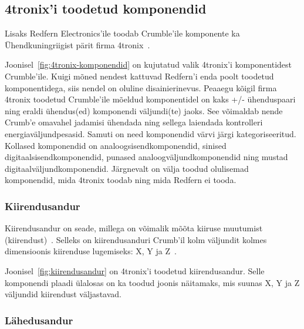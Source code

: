 \documentclass[12pt]{article}
\begin{document}
\subsection{4tronix'i toodetud komponendid}

Lisaks Redfern Electronics’ile toodab Crumble’ile komponente ka Ühendkuningriigist pärit firma 4tronix~\cite{Crumble4tronix}.


Joonisel~\ref{fig:4tronix-komponendid} on kujutatud valik 4tronix’i komponentidest Crumble’ile. Kuigi mõned nendest kattuvad Redfern’i enda poolt toodetud komponentidega, siis nendel on oluline disainierinevus. Peaaegu kõigil firma 4tronix toodetud Crumble’ile mõeldud komponentidel on kaks +/- ühenduspaari ning eraldi ühendus(ed) komponendi väljundi(te) jaoks. See võimaldab nende Crumb’e omavahel jadamisi ühendada ning sellega laiendada kontrolleri energiaväljundpesasid. Samuti on need komponendid värvi järgi kategoriseeritud. Kollased komponendid on analoogsisendkomponendid, sinised digitaalsisendkomponendid, punased analoogväljundkomponendid ning mustad digitaalväljundkomponendid. Järgnevalt on välja toodud olulisemad komponendid, mida 4tronix toodab ning mida Redfern ei tooda.

\subsubsection{Kiirendusandur} \label{kiirendus}

Kiirendusandur on seade, millega on võimalik mõõta kiiruse muutumist (kiirendust)~\cite{Kiirendusandur}. Selleks on kiirendusanduri Crumb’il kolm väljundit kolmes dimensioonis kiirenduse lugemiseks: X, Y ja Z~\cite{MotionSensorCrumbAccelerometerforCrumbleController}.


Joonisel~\ref{fig:kiirendusandur} on 4tronix’i toodetud kiirendusandur. Selle komponendi plaadi ülalosas on ka toodud joonis näitamaks, mis suunas X, Y ja Z väljundid kiirendust väljastavad.

\subsubsection{Lähedusandur}

\end{document}
